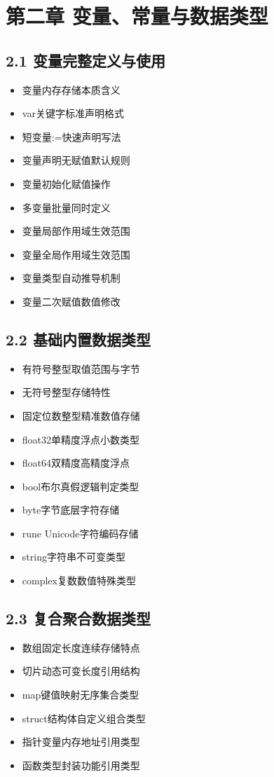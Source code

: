\section{第二章 变量、常量与数据类型}
\subsection{2.1 变量完整定义与使用}
\begin{itemize}
\item 变量内存存储本质含义
\item var关键字标准声明格式
\item 短变量:=快速声明写法
\item 变量声明无赋值默认规则
\item 变量初始化赋值操作
\item 多变量批量同时定义
\item 变量局部作用域生效范围
\item 变量全局作用域生效范围
\item 变量类型自动推导机制
\item 变量二次赋值数值修改
\end{itemize}

\subsection{2.2 基础内置数据类型}
\begin{itemize}
\item 有符号整型取值范围与字节
\item 无符号整型存储特性
\item 固定位数整型精准数值存储
\item float32单精度浮点小数类型
\item float64双精度高精度浮点
\item bool布尔真假逻辑判定类型
\item byte字节底层字符存储
\item rune Unicode字符编码存储
\item string字符串不可变类型
\item complex复数数值特殊类型
\end{itemize}

\subsection{2.3 复合聚合数据类型}
\begin{itemize}
\item 数组固定长度连续存储特点
\item 切片动态可变长度引用结构
\item map键值映射无序集合类型
\item struct结构体自定义组合类型
\item 指针变量内存地址引用类型
\item 函数类型封装功能引用类型
\end{itemize}

